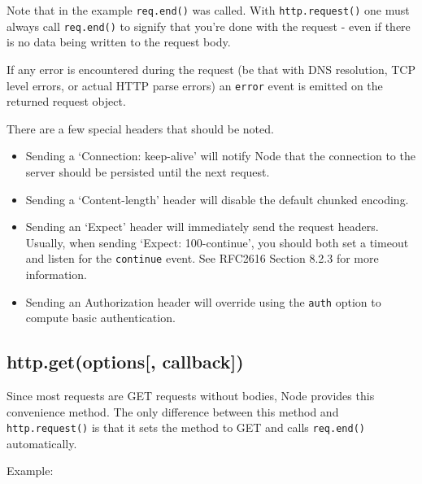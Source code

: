 Note that in the example \texttt{req.end()} was called. With
\texttt{http.request()} one must always call \texttt{req.end()} to
signify that you're done with the request - even if there is no data
being written to the request body.

If any error is encountered during the request (be that with DNS
resolution, TCP level errors, or actual HTTP parse errors) an
\texttt{\textquotesingle{}error\textquotesingle{}} event is emitted on
the returned request object.

There are a few special headers that should be noted.

\begin{itemize}
\item
  Sending a `Connection: keep-alive' will notify Node that the
  connection to the server should be persisted until the next request.
\item
  Sending a `Content-length' header will disable the default chunked
  encoding.
\item
  Sending an `Expect' header will immediately send the request headers.
  Usually, when sending `Expect: 100-continue', you should both set a
  timeout and listen for the \texttt{continue} event. See RFC2616
  Section 8.2.3 for more information.
\item
  Sending an Authorization header will override using the \texttt{auth}
  option to compute basic authentication.
\end{itemize}

\subsection{http.get(options{[},
callback{]})}\label{http.getoptions-callback}

Since most requests are GET requests without bodies, Node provides this
convenience method. The only difference between this method and
\texttt{http.request()} is that it sets the method to GET and calls
\texttt{req.end()} automatically.

Example:

\begin{Shaded}
\begin{Highlighting}[]
\NormalTok{(}\NormalTok{, }
  \NormalTok{(} \NormalTok{+ }\NormalTok{);}
\NormalTok{(}\NormalTok{, }
  \NormalTok{(} \NormalTok{+ }\NormalTok{);}
\NormalTok{\});}
\end{Highlighting}
\end{Shaded}

